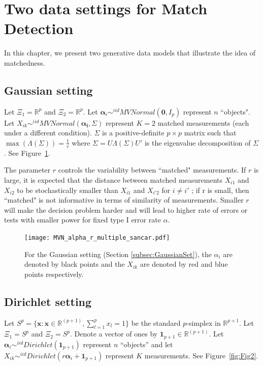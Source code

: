 \documentclass[12pt,oneside,final]{thesis}\usepackage[]{graphicx}\usepackage[]{color}
\begin{document}
\section{Two data settings for Match Detection\label{sec:data_settings}}


  In this chapter, we present two generative data models that illustrate the idea of matchedness.
\subsection{Gaussian setting\label{subsec:GaussianSet}}
  Let    $\Xi_1 = \mathbb{R}^{p}$ and $\Xi_2 = \mathbb{R}^{p}$.
  Let $\bm{\alpha}_i \sim^{iid} MVNormal(\bm{0},I_p)$ represent $n$ ``objects".  Let $X_{ik} \sim^{iid} MVNormal(\bm{\alpha_i},\Sigma)$ represent $K=2$ matched measurements (each under a different condition).
  $\Sigma$ is a positive-definite $p\times p$ matrix such that  $\max(\Lambda(\Sigma))=\frac{1}{r} $ where $\Sigma=U\Lambda(\Sigma)U'$  is the eigenvalue decomposition of $\Sigma$. See Figure~\ref{fig:Fig1}.

The parameter $r$ controls the variability between ``matched" measurements. If $r$ is large, it is expected that the distance between matched measurements
$X_{i1}$ and $X_{i2}$ to be stochastically smaller than $X_{i1}$ and $X_{i'2}$ for $i \neq i'$ ; if r is small, then ``matched" is not informative in terms of similarity of measurements.
 Smaller $r$ will make the decision problem harder and will lead to higher rate of errors or tests with smaller power for fixed type I error rate $\alpha$.
  
    \begin{figure}
  \begin{center}
    \texttt{[image: MVN\_alpha\_r\_multiple\_sancar.pdf]}
    \caption{For the  Gaussian setting (Section \ref{subsec:GaussianSet}), the $\alpha_i$ are denoted by black points and the $X_{ik}$ are denoted by red and blue points respectively.\label{fig:Fig1}}
	\end{center}
  \end{figure}

\subsection{Dirichlet setting\label{subsec:DirichletSet}}
Let $S^p=\{\bm{x}:\bm{x}\in\mathbb{R}^{(p+1)}, \sum_{l=1}^p{x_l}=1\}$ be the standard $p$-simplex in $\mathbb{R}^{p+1}$.
 Let $\Xi_1 = S^p$ and $\Xi_2 = S^p$.   Denote a vector of ones by $\bm{1}_{p+1}\in \mathbb{R}^{(p+1)}$.
  Let $\bm{\alpha}_i \sim^{iid} Dirichlet(\bm{1}_{p+1})$ represent $n$  ``objects'' and let $X_{ik} \sim^{iid} Dirichlet(r\bm{\alpha}_i+\bm{1}_{p+1})$ represent $K$ measurements. See Figure~\ref{fig:Fig2}.
\end{document}
